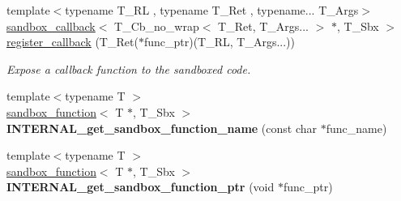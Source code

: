 \begin{DoxyCompactItemize}
{\footnotesize template$<$typename T\+\_\+\+RL , typename T\+\_\+\+Ret , typename... T\+\_\+\+Args$>$ }\\\hyperlink{classrlbox_1_1sandbox__callback}{sandbox\+\_\+callback}$<$ T\+\_\+\+Cb\+\_\+no\+\_\+wrap$<$ T\+\_\+\+Ret, T\+\_\+\+Args... $>$ $\ast$, T\+\_\+\+Sbx $>$ \hyperlink{classrlbox_1_1rlbox__sandbox_ae4f4cc7825bcb613ab5405e0f6cae7f3}{register\+\_\+callback} (T\+\_\+\+Ret($\ast$func\+\_\+ptr)(T\+\_\+\+RL, T\+\_\+\+Args...))
\begin{DoxyCompactList}\small\item\em Expose a callback function to the sandboxed code. \end{DoxyCompactList}\item 
\mbox{\label{classrlbox_1_1rlbox__sandbox_a5bee54535b32114c36b56672cb1996d2}} 
{\footnotesize template$<$typename T $>$ }\\\hyperlink{classrlbox_1_1sandbox__function}{sandbox\+\_\+function}$<$ T $\ast$, T\+\_\+\+Sbx $>$ {\bfseries I\+N\+T\+E\+R\+N\+A\+L\+\_\+get\+\_\+sandbox\+\_\+function\+\_\+name} (const char $\ast$func\+\_\+name)
\item 
\mbox{\label{classrlbox_1_1rlbox__sandbox_aa0585f98cac7d66c4ed0616fe7f80d79}} 
{\footnotesize template$<$typename T $>$ }\\\hyperlink{classrlbox_1_1sandbox__function}{sandbox\+\_\+function}$<$ T $\ast$, T\+\_\+\+Sbx $>$ {\bfseries I\+N\+T\+E\+R\+N\+A\+L\+\_\+get\+\_\+sandbox\+\_\+function\+\_\+ptr} (void $\ast$func\+\_\+ptr)
\end{DoxyCompactItemize}
